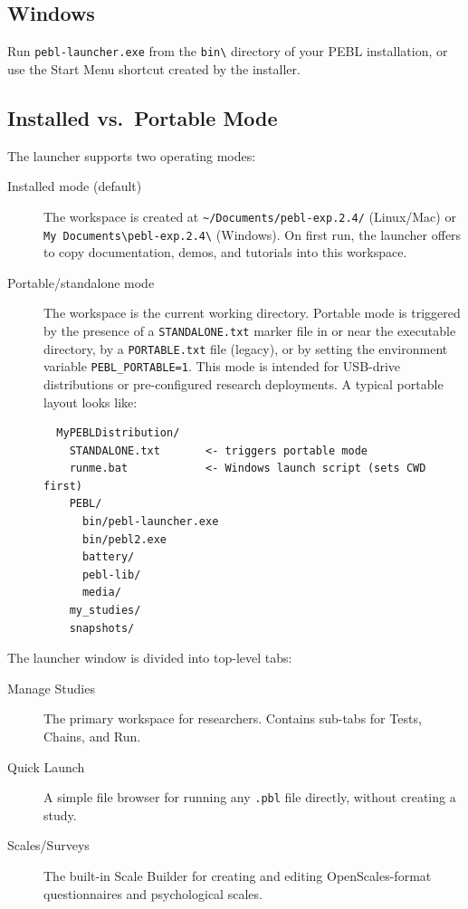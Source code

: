 \subsection{Windows}

Run \texttt{pebl-launcher.exe} from the \texttt{bin\textbackslash}
directory of your PEBL installation, or use the Start Menu shortcut
created by the installer.

\subsection{Installed vs.\ Portable Mode}

The launcher supports two operating modes:

\begin{description}
\item[Installed mode (default)] The workspace is created at
  \texttt{\textasciitilde/Documents/pebl-exp.2.4/} (Linux/Mac) or
  \texttt{My Documents\textbackslash pebl-exp.2.4\textbackslash} (Windows).
  On first run, the launcher offers to copy documentation, demos, and
  tutorials into this workspace.

\item[Portable/standalone mode] The workspace is the current working
  directory.  Portable mode is triggered by the presence of a
  \texttt{STANDALONE.txt} marker file in or near the executable directory,
  by a \texttt{PORTABLE.txt} file (legacy), or by setting the environment
  variable \texttt{PEBL\_PORTABLE=1}.  This mode is intended for
  USB-drive distributions or pre-configured research deployments.
  A typical portable layout looks like:
\begin{verbatim}
  MyPEBLDistribution/
    STANDALONE.txt       <- triggers portable mode
    runme.bat            <- Windows launch script (sets CWD first)
    PEBL/
      bin/pebl-launcher.exe
      bin/pebl2.exe
      battery/
      pebl-lib/
      media/
    my_studies/
    snapshots/
\end{verbatim}
\end{description}



The launcher window is divided into top-level tabs:

\begin{description}
\item[Manage Studies] The primary workspace for researchers.  Contains
  sub-tabs for Tests, Chains, and Run.
\item[Quick Launch] A simple file browser for running any \texttt{.pbl}
  file directly, without creating a study.
\item[Scales/Surveys] The built-in Scale Builder for creating and editing
  OpenScales-format questionnaires and psychological scales.
\end{description}

